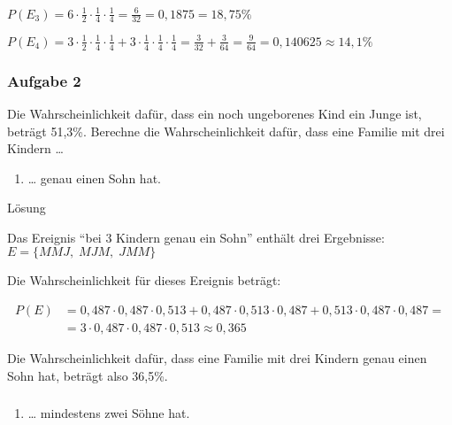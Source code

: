 \documentclass[
  ngerman,
]{book}
\providecommand{\tightlist}{%
  \setlength{\itemsep}{0pt}\setlength{\parskip}{0pt}}
\begin{document}
\(P(E_3)=6\cdot\frac{1}{2}\cdot\frac{1}{4}\cdot\frac{1}{4}=\frac{6}{32}=0,1875=18,75\%\)

\(P(E_4)=3\cdot\frac{1}{2}\cdot\frac{1}{4}\cdot\frac{1}{4} +3\cdot\frac{1}{4}\cdot\frac{1}{4}\cdot\frac{1}{4} = \frac{3}{32}+\frac{3}{64}=\frac{9}{64}=0,140625\approx 14,1\%\)

\hypertarget{section-128}{%
\subsubsection*{}\label{section-128}}

\hypertarget{aufgabe-2-13}{%
\subsubsection*{Aufgabe 2}\label{aufgabe-2-13}}

Die Wahrscheinlichkeit dafür, dass ein noch ungeborenes Kind ein Junge ist, beträgt 51,3\%. Berechne die Wahrscheinlichkeit dafür, dass eine Familie mit drei Kindern \ldots{}

\begin{enumerate}
\def\labelenumi{\alph{enumi})}
\tightlist
\item
  \ldots{} genau einen Sohn hat.
\end{enumerate}

Lösung

Das Ereignis ``bei 3 Kindern genau ein Sohn'' enthält drei Ergebnisse: \(E=\{MMJ,\;MJM,\;JMM\}\)

Die Wahrscheinlichkeit für dieses Ereignis beträgt:

\[\begin{align}P(E)&=0,487\cdot0,487\cdot0,513+0,487\cdot0,513\cdot0,487+0,513\cdot0,487\cdot0,487=\\
&=3\cdot0,487\cdot0,487\cdot0,513\approx 0,365\end{align}\]

Die Wahrscheinlichkeit dafür, dass eine Familie mit drei Kindern genau einen Sohn hat, beträgt also 36,5\%.

\hypertarget{section-129}{%
\subsubsection*{}\label{section-129}}

\begin{enumerate}
\def\labelenumi{\alph{enumi})}
\setcounter{enumi}{1}
\tightlist
\item
  \ldots{} mindestens zwei Söhne hat.
\end{enumerate}
\end{document}
